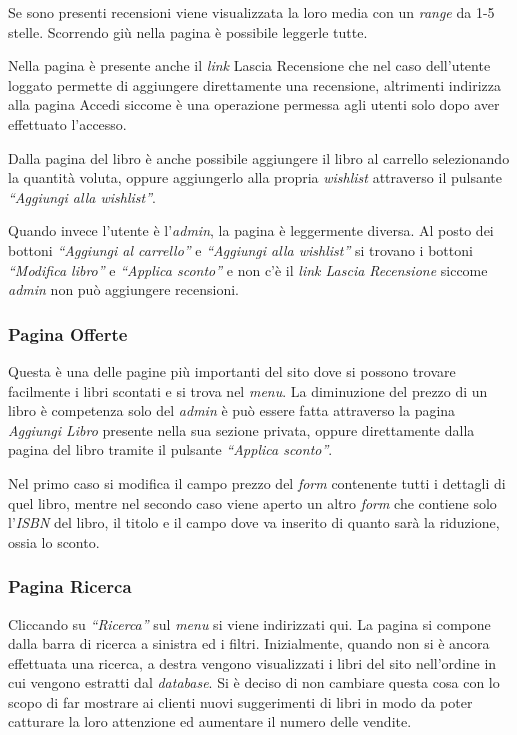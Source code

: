 Se sono presenti recensioni viene visualizzata la loro media con un \textit{range} da 1-5 stelle. Scorrendo giù nella pagina è possibile leggerle tutte.

Nella pagina è presente anche il \textit{link} Lascia Recensione che nel caso dell’utente loggato permette di aggiungere direttamente una recensione, altrimenti indirizza alla pagina Accedi siccome è una operazione permessa agli utenti solo dopo aver effettuato l’accesso.

Dalla pagina del libro è anche possibile aggiungere il libro al carrello selezionando la quantità voluta, oppure aggiungerlo alla propria \textit{wishlist} attraverso il pulsante \textit{“Aggiungi alla wishlist”}.

Quando invece l’utente è l’\textit{admin}, la pagina è leggermente diversa. Al posto dei bottoni \textit{“Aggiungi al carrello”} e \textit{“Aggiungi alla wishlist”} si trovano i bottoni \textit{“Modifica libro”} e \textit{“Applica sconto”} e non c’è il \textit{link Lascia Recensione} siccome \textit{admin} non può aggiungere recensioni.

\subsubsection{Pagina Offerte}
Questa è una delle pagine più importanti del sito dove si possono trovare facilmente i libri scontati e si trova nel \textit{menu}. La diminuzione del prezzo di un libro è competenza solo del \textit{admin} è può essere fatta attraverso la pagina \textit{Aggiungi Libro} presente nella sua sezione privata, oppure direttamente dalla pagina del libro tramite il pulsante \textit{“Applica sconto”}.

Nel primo caso si modifica il campo prezzo del \textit{form} contenente tutti i dettagli di quel libro, mentre nel secondo caso viene aperto un altro \textit{form} che contiene solo l’\textit{ISBN} del libro, il titolo e il campo dove va inserito di quanto sarà la riduzione, ossia lo sconto.

\subsubsection{Pagina Ricerca}
Cliccando su \textit{“Ricerca”} sul \textit{menu} si viene indirizzati qui. La pagina si compone dalla barra di ricerca a sinistra ed i filtri. Inizialmente, quando non si è ancora effettuata una ricerca, a destra vengono visualizzati i libri del sito nell'ordine in cui vengono estratti dal \textit{database}. Si è deciso di non cambiare questa cosa con lo scopo di far mostrare ai clienti nuovi suggerimenti di libri in modo da poter catturare la loro attenzione ed aumentare il numero delle vendite.


